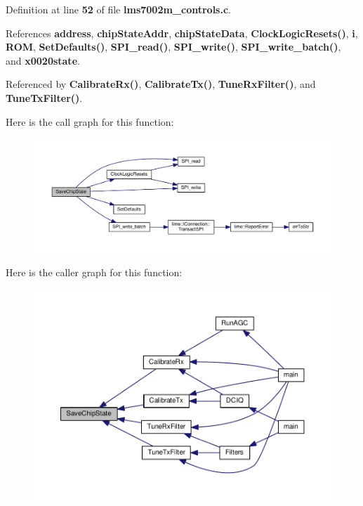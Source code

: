 Definition at line {\bf 52} of file {\bf lms7002m\+\_\+controls.\+c}.



References {\bf address}, {\bf chip\+State\+Addr}, {\bf chip\+State\+Data}, {\bf Clock\+Logic\+Resets()}, {\bf i}, {\bf R\+OM}, {\bf Set\+Defaults()}, {\bf S\+P\+I\+\_\+read()}, {\bf S\+P\+I\+\_\+write()}, {\bf S\+P\+I\+\_\+write\+\_\+batch()}, and {\bf x0020state}.



Referenced by {\bf Calibrate\+Rx()}, {\bf Calibrate\+Tx()}, {\bf Tune\+Rx\+Filter()}, and {\bf Tune\+Tx\+Filter()}.



Here is the call graph for this function\+:
\nopagebreak
\begin{figure}[H]
\begin{center}
\leavevmode
\includegraphics[width=350pt]{d3/d86/lms7002m__controls_8h_a1ed7dc939bfc16c3178b901647de0640_cgraph}
\end{center}
\end{figure}




Here is the caller graph for this function\+:
\nopagebreak
\begin{figure}[H]
\begin{center}
\leavevmode
\includegraphics[width=350pt]{d3/d86/lms7002m__controls_8h_a1ed7dc939bfc16c3178b901647de0640_icgraph}
\end{center}
\end{figure}


